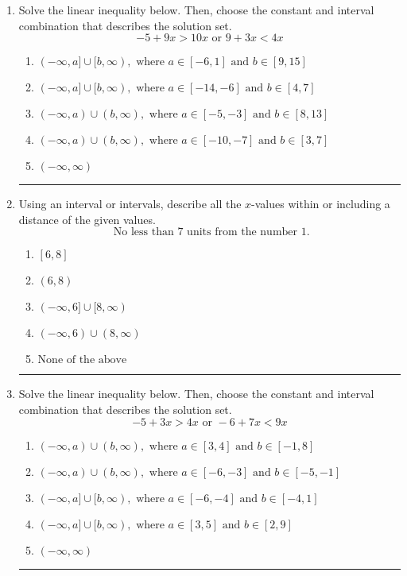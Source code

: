 \documentclass[14pt]{extbook}
\newcommand{\litem}[1]{\item#1\hspace*{-1cm}\rule{\textwidth}{0.4pt}}
\begin{document}
\begin{enumerate}
{\begin{enumerate}[label=\Alph*.]
\end{enumerate} }
\litem{
Solve the linear inequality below. Then, choose the constant and interval combination that describes the solution set.\[ -5 + 9 x > 10 x \text{ or } 9 + 3 x < 4 x \]\begin{enumerate}[label=\Alph*.]
\item \( (-\infty, a] \cup [b, \infty), \text{ where } a \in [-6, 1] \text{ and } b \in [9, 15] \)
\item \( (-\infty, a] \cup [b, \infty), \text{ where } a \in [-14, -6] \text{ and } b \in [4, 7] \)
\item \( (-\infty, a) \cup (b, \infty), \text{ where } a \in [-5, -3] \text{ and } b \in [8, 13] \)
\item \( (-\infty, a) \cup (b, \infty), \text{ where } a \in [-10, -7] \text{ and } b \in [3, 7] \)
\item \( (-\infty, \infty) \)

\end{enumerate} }
\litem{
Using an interval or intervals, describe all the $x$-values within or including a distance of the given values.\[ \text{ No less than } 7 \text{ units from the number } 1. \]\begin{enumerate}[label=\Alph*.]
\item \( [6, 8] \)
\item \( (6, 8) \)
\item \( (-\infty, 6] \cup [8, \infty) \)
\item \( (-\infty, 6) \cup (8, \infty) \)
\item \( \text{None of the above} \)

\end{enumerate} }
\litem{
Solve the linear inequality below. Then, choose the constant and interval combination that describes the solution set.\[ -5 + 3 x > 4 x \text{ or } -6 + 7 x < 9 x \]\begin{enumerate}[label=\Alph*.]
\item \( (-\infty, a) \cup (b, \infty), \text{ where } a \in [3, 4] \text{ and } b \in [-1, 8] \)
\item \( (-\infty, a) \cup (b, \infty), \text{ where } a \in [-6, -3] \text{ and } b \in [-5, -1] \)
\item \( (-\infty, a] \cup [b, \infty), \text{ where } a \in [-6, -4] \text{ and } b \in [-4, 1] \)
\item \( (-\infty, a] \cup [b, \infty), \text{ where } a \in [3, 5] \text{ and } b \in [2, 9] \)
\item \( (-\infty, \infty) \)


\end{enumerate}}
\end{enumerate}
\end{document}
